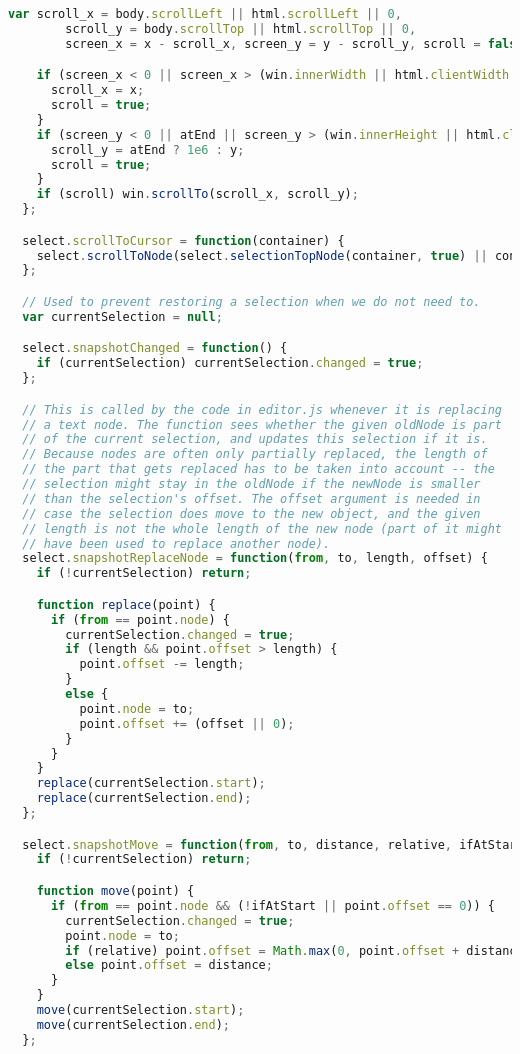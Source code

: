 \begin{lstlisting}[language=Javascript]
    var scroll_x = body.scrollLeft || html.scrollLeft || 0,
        scroll_y = body.scrollTop || html.scrollTop || 0,
        screen_x = x - scroll_x, screen_y = y - scroll_y, scroll = false;

    if (screen_x < 0 || screen_x > (win.innerWidth || html.clientWidth || 0)) {
      scroll_x = x;
      scroll = true;
    }
    if (screen_y < 0 || atEnd || screen_y > (win.innerHeight || html.clientHeight || 0) - 50) {
      scroll_y = atEnd ? 1e6 : y;
      scroll = true;
    }
    if (scroll) win.scrollTo(scroll_x, scroll_y);
  };

  select.scrollToCursor = function(container) {
    select.scrollToNode(select.selectionTopNode(container, true) || container.firstChild);
  };

  // Used to prevent restoring a selection when we do not need to.
  var currentSelection = null;

  select.snapshotChanged = function() {
    if (currentSelection) currentSelection.changed = true;
  };

  // This is called by the code in editor.js whenever it is replacing
  // a text node. The function sees whether the given oldNode is part
  // of the current selection, and updates this selection if it is.
  // Because nodes are often only partially replaced, the length of
  // the part that gets replaced has to be taken into account -- the
  // selection might stay in the oldNode if the newNode is smaller
  // than the selection's offset. The offset argument is needed in
  // case the selection does move to the new object, and the given
  // length is not the whole length of the new node (part of it might
  // have been used to replace another node).
  select.snapshotReplaceNode = function(from, to, length, offset) {
    if (!currentSelection) return;

    function replace(point) {
      if (from == point.node) {
        currentSelection.changed = true;
        if (length && point.offset > length) {
          point.offset -= length;
        }
        else {
          point.node = to;
          point.offset += (offset || 0);
        }
      }
    }
    replace(currentSelection.start);
    replace(currentSelection.end);
  };

  select.snapshotMove = function(from, to, distance, relative, ifAtStart) {
    if (!currentSelection) return;

    function move(point) {
      if (from == point.node && (!ifAtStart || point.offset == 0)) {
        currentSelection.changed = true;
        point.node = to;
        if (relative) point.offset = Math.max(0, point.offset + distance);
        else point.offset = distance;
      }
    }
    move(currentSelection.start);
    move(currentSelection.end);
  };


\end{lstlisting}
